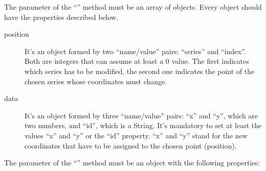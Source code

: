 			The parameter of the “” method must be an array of objects. Every object should have the properties described below.
			\begin{description}
				\item[position] It's an object formed by two “name/value” pairs: “series” and “index”. Both are integers that can assume at least a 0 value. The first indicates which series has to be modified, the second one indicates the point of the chosen series whose coordinates must change. 
				\item[data] It's an object formed by three “name/value” pairs: “x” and “y”, which are two numbers, and “id”, which is a String. It's mandatory to set at least the values “x” and “y” or the “id” property. “x” and “y” stand for the new coordinates that have to be assigned to the chosen point (position).
			\end{description}
			The parameter of the “” method must be an object with the following properties:
